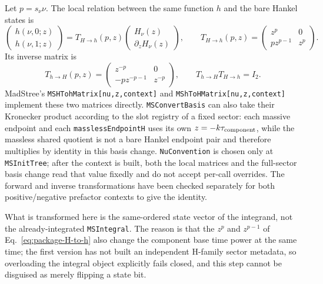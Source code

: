 \documentclass[11pt,a4paper]{article}
\begin{document}
Let $p=s_\nu\nu$. The local relation between the same function $h$ and the bare Hankel states is
\begin{equation}
 \begin{pmatrix}h(\nu,0;z)\\h(\nu,1;z)\end{pmatrix}
 =T_{H\to h}(p,z)
 \begin{pmatrix}H_\nu(z)\\\partial_zH_\nu(z)\end{pmatrix},
 \qquad
 T_{H\to h}(p,z)=
 \begin{pmatrix}
  z^p&0\\p z^{p-1}&z^p
 \end{pmatrix}.
 \label{eq:package-H-to-h}
\end{equation}
Its inverse matrix is
\begin{equation}
 T_{h\to H}(p,z)=
 \begin{pmatrix}
  z^{-p}&0\\-p z^{-p-1}&z^{-p}
 \end{pmatrix},
 \qquad
 T_{h\to H}T_{H\to h}=I_2.
 \label{eq:package-h-to-H}
\end{equation}
MadStree's \texttt{MSHTohMatrix[nu,z,context]} and \texttt{MShToHMatrix[nu,z,context]} implement these two matrices directly. \texttt{MSConvertBasis} can also take their Kronecker product according to the slot registry of a fixed sector: each massive endpoint and each \texttt{masslessEndpointH} uses its own $z=-k\tau_{\rm component}$, while the massless shared quotient is not a bare Hankel endpoint pair and therefore multiplies by identity in this basis change. \texttt{NuConvention} is chosen only at \texttt{MSInitTree}; after the context is built, both the local matrices and the full-sector basis change read that value fixedly and do not accept per-call overrides. The forward and inverse transformations have been checked separately for both positive/negative prefactor contexts to give the identity.

What is transformed here is the same-ordered state vector of the integrand, not the already-integrated \texttt{MSIntegral}. The reason is that the $z^p$ and $z^{p-1}$ of Eq.~\eqref{eq:package-H-to-h} also change the component base time power at the same time; the first version has not built an independent H-family sector metadata, so overloading the integral object explicitly fails closed, and this step cannot be disguised as merely flipping a state bit.
\end{document}
